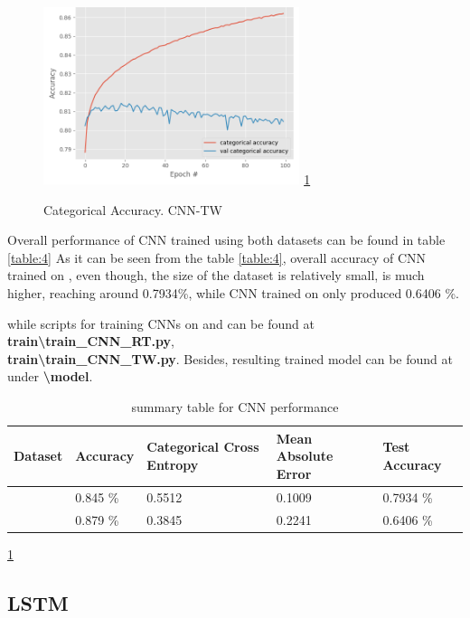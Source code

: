 \documentclass[conference]{IEEEtran}
\begin{document}
			\begin{figure}
				\caption{Categorical Accuracy. CNN-TW}
				\centering
				\includegraphics[width=7.5cm]{categorical_accuracy_cnn-TW.png}
				\label{figure:4}
				\ref{figure:4}
			\end{figure}
		
		Overall performance of CNN trained using both datasets can be found in table \ref{table:4}
		As it can be seen from the table \ref{table:4}, overall accuracy of CNN trained on \RT, even though, the size of the dataset is relatively small, is much higher, reaching around 0.7934\%, while CNN trained on \TW only produced 0.6406 \%.
		
		while scripts for training CNNs on \RT and \TW can be found at \textbf{\\train\textbackslash train\_CNN\_RT.py}, \textbf{\\train\textbackslash train\_CNN\_TW.py}. Besides, resulting trained model can be found at \cite{report:repo} under \textbf{\textbackslash model}.
		
		\begin{table}
			\centering
			\begin{tabular}{| m{2cm} | m{1.1cm} | m{1.1cm} | m{1.1cm} |  m{1.1cm} | } 
				\hline
				Dataset & Accuracy & Categorical Cross Entropy & Mean Absolute Error & Test Accuracy\\
				\hline
				\RT & 0.845 \% & 0.5512 & 0.1009 & 0.7934 \% \\ 
				\hline
				\TW & 0.879 \% & 0.3845 & 0.2241 & 0.6406 \% \\ 
				\hline
			\end{tabular}
			\caption{summary table for CNN performance}
			\label{table:3}
			\ref{table:3}
		\end{table}
	
	\subsection{LSTM}
	
\end{document}
